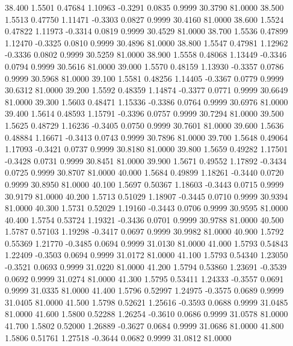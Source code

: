   38.400   1.5501   0.47684   1.10963  -0.3291   0.0835   0.9999  30.3790  81.0000
  38.500   1.5513   0.47750   1.11471  -0.3303   0.0827   0.9999  30.4160  81.0000
  38.600   1.5524   0.47822   1.11973  -0.3314   0.0819   0.9999  30.4529  81.0000
  38.700   1.5536   0.47899   1.12470  -0.3325   0.0810   0.9999  30.4896  81.0000
  38.800   1.5547   0.47981   1.12962  -0.3336   0.0802   0.9999  30.5259  81.0000
  38.900   1.5558   0.48068   1.13449  -0.3346   0.0794   0.9999  30.5616  81.0000
  39.000   1.5570   0.48159   1.13930  -0.3357   0.0786   0.9999  30.5968  81.0000
  39.100   1.5581   0.48256   1.14405  -0.3367   0.0779   0.9999  30.6312  81.0000
  39.200   1.5592   0.48359   1.14874  -0.3377   0.0771   0.9999  30.6649  81.0000
  39.300   1.5603   0.48471   1.15336  -0.3386   0.0764   0.9999  30.6976  81.0000
  39.400   1.5614   0.48593   1.15791  -0.3396   0.0757   0.9999  30.7294  81.0000
  39.500   1.5625   0.48729   1.16236  -0.3405   0.0750   0.9999  30.7601  81.0000
  39.600   1.5636   0.48884   1.16671  -0.3413   0.0743   0.9999  30.7896  81.0000
  39.700   1.5648   0.49064   1.17093  -0.3421   0.0737   0.9999  30.8180  81.0000
  39.800   1.5659   0.49282   1.17501  -0.3428   0.0731   0.9999  30.8451  81.0000
  39.900   1.5671   0.49552   1.17892  -0.3434   0.0725   0.9999  30.8707  81.0000
  40.000   1.5684   0.49899   1.18261  -0.3440   0.0720   0.9999  30.8950  81.0000
  40.100   1.5697   0.50367   1.18603  -0.3443   0.0715   0.9999  30.9179  81.0000
  40.200   1.5713   0.51029   1.18907  -0.3445   0.0710   0.9999  30.9394  81.0000
  40.300   1.5731   0.52029   1.19160  -0.3443   0.0706   0.9999  30.9595  81.0000
  40.400   1.5754   0.53724   1.19321  -0.3436   0.0701   0.9999  30.9788  81.0000
  40.500   1.5787   0.57103   1.19298  -0.3417   0.0697   0.9999  30.9982  81.0000
  40.900   1.5792   0.55369   1.21770  -0.3485   0.0694   0.9999  31.0130  81.0000
  41.000   1.5793   0.54843   1.22409  -0.3503   0.0694   0.9999  31.0172  81.0000
  41.100   1.5793   0.54340   1.23050  -0.3521   0.0693   0.9999  31.0220  81.0000
  41.200   1.5794   0.53860   1.23691  -0.3539   0.0692   0.9999  31.0274  81.0000
  41.300   1.5795   0.53411   1.24333  -0.3557   0.0691   0.9999  31.0335  81.0000
  41.400   1.5796   0.52997   1.24975  -0.3575   0.0689   0.9999  31.0405  81.0000
  41.500   1.5798   0.52621   1.25616  -0.3593   0.0688   0.9999  31.0485  81.0000
  41.600   1.5800   0.52288   1.26254  -0.3610   0.0686   0.9999  31.0578  81.0000
  41.700   1.5802   0.52000   1.26889  -0.3627   0.0684   0.9999  31.0686  81.0000
  41.800   1.5806   0.51761   1.27518  -0.3644   0.0682   0.9999  31.0812  81.0000
